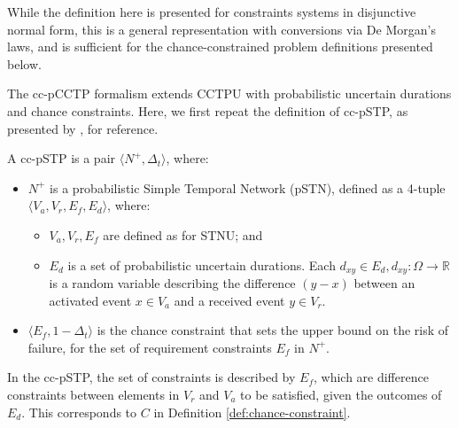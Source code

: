 \documentclass[jair,twoside,11pt,theapa]{article}
\begin{document}
While the definition here is presented for constraints systems in disjunctive normal form, this is a general representation with conversions via De Morgan's laws, and is sufficient for the chance-constrained problem definitions presented below.

The cc-pCCTP formalism extends CCTPU with probabilistic uncertain durations and chance
constraints. Here, we first repeat the definition of cc-pSTP, as presented by
, for reference.


\begin{mydef}
	
	A cc-pSTP is a pair $\langle N^+,\Delta_t\rangle$, where:
	
	\begin{itemize}
		
		\item $N^+$ is a probabilistic Simple Temporal Network (pSTN), defined as a
		4-tuple $\langle V_a,V_r,E_f,E_d\rangle$, where:
		
		\begin{itemize}
			
			\item $V_a,V_r,E_f$ are defined as for STNU; and 
			
			\item $E_d$ is a set of probabilistic uncertain durations. Each $d_{xy}\in
			E_d, d_{xy}:\Omega\rightarrow\mathbb{R}$ is a random variable describing the difference $(y-x)$ between an activated 
			event $x\in V_a$ and a received event $y\in V_r$. 
			
		\end{itemize}
		
		\item $\langle E_f, 1 - \Delta_t\rangle$ is the chance constraint that sets the upper bound
		on the risk of failure, for the set of requirement constraints $E_f$ in $N^+$.
		
	\end{itemize}
	
	
\end{mydef}

In the cc-pSTP, the set of constraints is described by $E_f$, which are
difference constraints between elements in $V_r$ and $V_a$ to be satisfied,
given the outcomes of $E_d$. This corresponds to $C$ in Definition
\ref{def:chance-constraint}.
\end{document}
